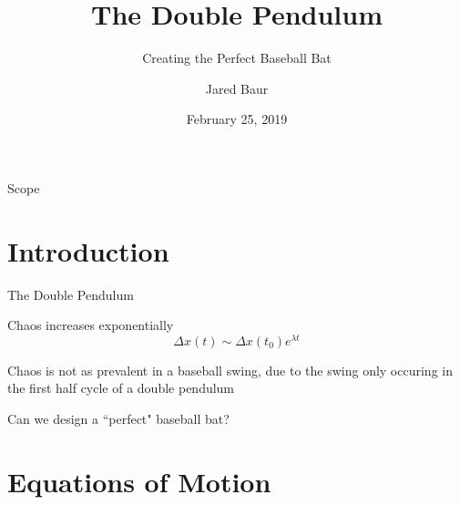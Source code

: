\documentclass[tikz]{beamer}
\title{The Double Pendulum}
\subtitle{Creating the Perfect Baseball Bat}
\author{Jared Baur}
\institute[Occidental College] %
{
  Physics Department\\
  Occidental College
}
\date{February 25, 2019}
\begin{document}
\begin{frame}
  \titlepage
\end{frame}

\begin{frame}{Scope}
  \tableofcontents
\end{frame}


\section{Introduction}

\begin{frame}{The Double Pendulum}
	\only<1> {	
    		\begin{figure}
		    \centering
		\end{figure}
	}
	 {
    		\begin{figure}
		    \centering
		\end{figure}

		Chaos increases exponentially
		\begin{equation}
			\Delta x(t) \sim \Delta x(t_0) e^{\lambda t} \tag{1}
		\end{equation}
	}
	 {
		Chaos is not as prevalent in a baseball swing, due to the swing only occuring in the first half cycle of a double pendulum
    		\begin{figure}
		    \centering
		\end{figure}
		Can we design a ``perfect" baseball bat?
	}
\end{frame}

\section{Equations of Motion}
\end{document}
